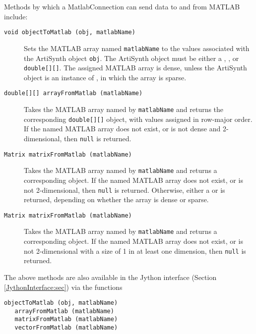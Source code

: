 \documentclass{article}
\begin{document}
Methods by which a MatlabConnection can send data to and from MATLAB
include:

\begin{description}

\item[{\tt void objectToMatlab (obj, matlabName)} ] \mbox{}

Sets the MATLAB array named {\tt matlabName} to the values associated
with the ArtiSynth object {\tt obj}. The ArtiSynth object must be
either a ,
, or {\tt double[][]}.  The assigned MATLAB
array is dense, unless the ArtiSynth object is an instance of
, in which the array
is sparse.

\item[{\tt double[][] arrayFromMatlab (matlabName)}] \mbox{}

Takes the MATLAB array named by {\tt matlabName} and returns the
corresponding {\tt double[][]} object, with values assigned in
row-major order. If the named MATLAB array does not exist, or is not
dense and 2-dimensional, then {\tt null} is returned.

\item[{\tt Matrix matrixFromMatlab (matlabName)}] \mbox{}

Takes the MATLAB array named by {\tt matlabName} and returns a
corresponding  object.  If the named
MATLAB array does not exist, or is not 2-dimensional, then {\tt null}
is returned. Otherwise, either a 
or  is returned, depending
on whether the array is dense or sparse.

\item[{\tt Matrix matrixFromMatlab (matlabName)}] \mbox{}

Takes the MATLAB array named by {\tt matlabName} and returns a
corresponding  object.  If the
named MATLAB array does not exist, or is not 2-dimensional with a size
of 1 in at least one dimension, then {\tt null} is returned.

\end{description}

The above methods are also available in the Jython interface (Section
\ref{JythonInterface:sec}) via the functions
%
\begin{lstlisting}[]
   objectToMatlab (obj, matlabName)
   arrayFromMatlab (matlabName)
   matrixFromMatlab (matlabName)
   vectorFromMatlab (matlabName)
\end{lstlisting}
%
\end{document}
